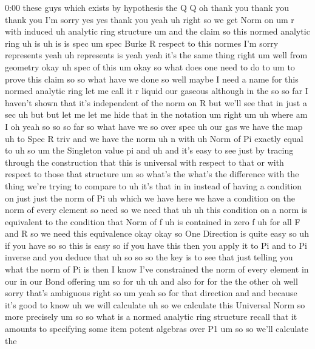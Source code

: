 \begin{unfinished}{0:00}
these  guys  which  exists  by
hypothesis
the  Q  Q  oh  thank  you  thank  you  thank  you
I'm  sorry  yes  yes  thank  you
yeah  uh  right  so  we  get  Norm  on
um  r  with
induced  uh  analytic  ring
structure
um  and  the
claim  so  this  normed  analytic
ring  uh  is  uh  is  is
spec
um  spec  Burke
R  respect  to  this
normes  I'm  sorry  represents  yeah  uh
represents  is
yeah
yeah  it's  the  same  thing  right
um  well  from  geometry  okay  uh  spec  of
this
um  okay
so  what  does  one  need  to  do  to
um  to  prove  this
claim  so  so  what  have  we  done  so  well
maybe  I  need  a  name  for  this  normed
analytic  ring  let  me  call  it  r  liquid
our  gaseous  although  in  the  so  so  far  I
haven't  shown  that  it's  independent  of
the  norm  on  R  but  we'll  see  that  in  just
a  sec
uh  but  but  let  me  let  me  hide  that  in
the
notation
um
right
um  uh  where  am  I  oh  yeah  so  so  so  far  so
what  have  we  so
over  spec  uh  our  gas
we  have  the
map  uh  to  Spec  R
triv  and  we  have  the
norm  uh  n  with  uh  Norm  of  Pi  exactly
equal  to  uh
so
um  the  Singleton  value  pi  and  uh  and
it's  easy  to  see  just  by  tracing  through
the  construction  that  this  is  universal
with  respect  to
that
or  with  respect  to  those  that
structure  um  so  what's  the  what's  the
difference  with  the  thing  we're  trying
to  compare  to  uh  it's  that  in  in  instead
of  having  a  condition  on  just  just  the
norm  of
Pi  uh  which  we  have  here  we  have  a
condition  on  the  norm  of  every  element
so
need  so  we
need  that  uh  uh  this  condition  on  a  norm
is  equivalent  to  the  condition  that  Norm
of  f  uh  is  contained  in  zero
f  uh  for  all  F  and
R  so  we  need  this
equivalence  okay  okay  so  One  Direction
is  quite  easy  so  uh  if  you  have  so  so
this  is
easy  so  if  you  have  this  then  you  apply
it  to  Pi  and  to  Pi  inverse  and  you
deduce  that  uh  so
so  so  the  key  is  to  see  that  just
telling  you  what  the  norm  of  Pi  is  then
I  know  I've  constrained  the  norm  of
every  element  in  our  in  our  Bond
offering  um  so  for
uh  uh  and  also  for  for  the  the  other  oh
well  sorry  that's  ambiguous  right  so
um  yeah  so  for  that  direction  and  and
because  it's  good  to  know  uh  we  will
calculate
uh  so  we  calculate  this  Universal
Norm  so  more
precisely  um
so  so  what  is  a  normed  analytic  ring
structure  recall  that  it  amounts  to
specifying  some  item  potent  algebras
over  P1  um  so  so  we'll
calculate  the

\end{unfinished}
